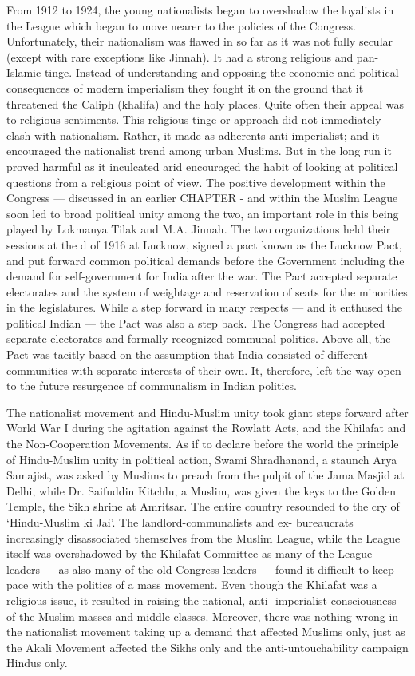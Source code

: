 From 1912 to 1924, the young nationalists began to overshadow the loyalists in the League which began to move nearer to the policies of the Congress. Unfortunately, their nationalism was flawed in so far as it was not fully secular (except with rare exceptions like Jinnah). It had a strong religious and pan-Islamic tinge. Instead of understanding and opposing the economic and political consequences of modern imperialism they fought it on the ground that it threatened the Caliph (khalifa) and the holy places. Quite often their appeal was to religious sentiments. This religious tinge or approach did not immediately clash with nationalism. Rather, it made as adherents anti-imperialist; and it encouraged the nationalist trend among urban Muslims. But in the long run it proved harmful as it inculcated arid encouraged the habit of looking at political questions from a religious point of view. The positive development within the Congress --- discussed in an earlier CHAPTER - and within the Muslim League soon led to broad political unity among the two, an important role in this being played by Lokmanya Tilak and M.A. Jinnah. The two organizations held their sessions at the d of 1916 at Lucknow, signed a pact known as the Lucknow Pact, and put forward common political demands before the Government including the demand for self-government for India after the war. The Pact accepted separate electorates and the system of weightage and reservation of seats for the minorities in the legislatures. While a step forward in many respects --- and it enthused the political Indian --- the Pact was also a step back. The Congress had accepted separate electorates and formally recognized communal politics. Above all, the Pact was tacitly based on the assumption that India consisted of different communities with separate interests of their own. It, therefore, left the way open to the future resurgence of communalism in Indian politics. 

The nationalist movement and Hindu-Muslim unity took giant steps forward after World War I during the agitation against the Rowlatt Acts, and the Khilafat and the Non-Cooperation Movements. As if to declare before the world the principle of Hindu-Muslim unity in political action, Swami Shradhanand, a staunch Arya Samajist, was asked by Muslims to preach from the pulpit of the Jama Masjid at Delhi, while Dr. Saifuddin Kitchlu, a Muslim, was given the keys to the Golden Temple, the Sikh shrine at Amritsar. The entire country resounded to the cry of `Hindu-Muslim ki Jai'. The landlord-communalists and ex- bureaucrats increasingly disassociated themselves from the Muslim League, while the League itself was overshadowed by the Khilafat Committee as many of the League leaders --- as also many of the old Congress leaders --- found it difficult to keep pace with the politics of a mass movement. Even though the Khilafat was a religious issue, it resulted in raising the national, anti- imperialist consciousness of the Muslim masses and middle classes. Moreover, there was nothing wrong in the nationalist movement taking up a demand that affected Muslims only, just as the Akali Movement affected the Sikhs only and the anti-untouchability campaign Hindus only. 

